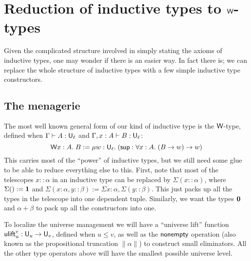 \section{Reduction of inductive types to $\mathsf{W}$-types}

Given the complicated structure involved in simply stating the axioms of inductive types, one may wonder if there is an easier way. In fact there is; we can replace the whole structure of inductive types with a few simple inductive type constructors.

\subsection{The menagerie}
The most well known general form of our kind of inductive type is the $\mathsf{W}$-type, defined when $\Gamma\vdash A:\U_\ell$ and $\Gamma,x:A\vdash B:\U_\ell$:
$$\mathsf{W} x:A.\;B:=\mu w:\mathsf{U}_\ell.\;(\mathsf{sup}:\forall x:A.\;(B\to w)\to w)$$
This carries most of the ``power'' of inductive types, but we still need some glue to be able to reduce everything else to this. First, note that most of the telescopes $x::\alpha$ in an inductive type can be replaced by $\Sigma(x::\alpha)$, where $\Sigma ():=\bf 1$ and $\Sigma (x:\alpha,y::\beta):=\Sigma x:\alpha,\Sigma(y::\beta)$. This just packs up all the types in the telescope into one dependent tuple. Similarly, we want the types $\bf 0$ and $\alpha+\beta$ to pack up all the constructors into one.

To localize the universe management we will have a ``universe lift'' function $\mathsf{ulift}_u^v:\mathsf{U}_u\to\mathsf{U}_v$, defined when $u\le v$, as well as the $\mathsf{nonempty}$ operation (also known as the propositional truncation $\|\alpha\|$) to construct small eliminators. All the other type operators above will have the smallest possible universe level.

